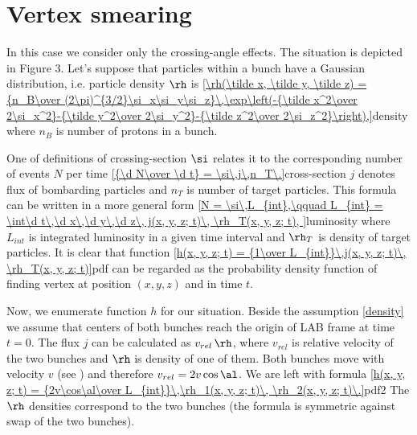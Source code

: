 \section{Vertex smearing}

In this case we consider only the crossing-angle effects. The situation is depicted in Figure 3. Let's suppose that particles within a bunch have a Gaussian distribution, i.e. particle density $\rh$ is
\eqref{\rh(\tilde x, \tilde y, \tilde z) = {n_B\over (2\pi)^{3/2}\si_x\si_y\si_z}\,\exp\left(-{\tilde x^2\over 2\si_x^2}-{\tilde y^2\over 2\si_y^2}-{\tilde z^2\over 2\si_z^2}\right),}{density}
where $n_B$ is number of protons in a bunch.


One of definitions of crossing-section $\si$ relates it to the corresponding number of events $N$ per time
\eqref{{\d N\over \d t} = \si\,j\,n_T\.}{cross-section}
$j$ denotes flux of bombarding particles and $n_T$ is number of target particles. This formula can be written in a more general form
\eqref{N = \si\,L_{int},\qquad L_{int} = \int\d t\,\d x\,\d y\,\d z\, j(x, y, z; t)\, \rh_T(x, y, z; t), }{luminosity}
where $L_{int}$ is integrated luminosity in a given time interval and $\rh_T$ is density of target particles. It is clear that function
\eqref{h(x, y, z; t) = {1\over L_{int}}\,j(x, y, z; t)\, \rh_T(x, y, z; t)}{pdf}
can be regarded as the probability density function of finding vertex at position $(x, y, z)$ and in time $t$.

Now, we enumerate function $h$ for our situation. Beside the assumption \ref{density} we assume that centers of both bunches reach the origin of LAB frame at time $t = 0$. The flux $j$ can be calculated as $v_{rel}\,\rh$, where $v_{rel}$ is relative velocity of the two bunches and $\rh$ is density of one of them. Both bunches move with velocity $v$ (see ) and therefore $v_{rel} = 2v\cos\al$. We are left with formula
\eqref{h(x, y, z; t) = {2v\cos\al\over L_{int}}\,\rh_1(x, y, z; t)\, \rh_2(x, y, z; t)\.}{pdf2}
The $\rh$ densities correspond to the two bunches (the formula is symmetric against swap of the two bunches).

